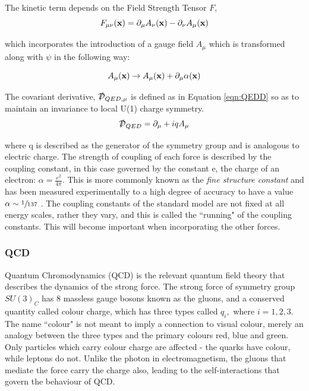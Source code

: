 The kinetic term depends on the Field Strength Tensor $F$, 
\begin{equation}
F_{\mu \nu} (\mathbf{x}) = \partial_{\mu} A_{\nu}(\mathbf{x}) -   \partial_{\nu} A_{\mu}(\mathbf{x}) 
\end{equation}

which incorporates the introduction of a gauge field $A_{\mu}$ which is transformed along with $\psi$ in the following way:

\begin{equation}
A_{\mu}(\mathbf{x}) \rightarrow A_{\mu}(\mathbf{x}) + \partial_{\mu} \alpha(\mathbf{x})
\label{AQED}
\end{equation}

The  covariant derivative, $\slashed{\mathcal{D}}_{QED,\mu}$ is defined as in Equation \ref{eqn:QEDD} so as to maintain an invariance to local U(1) charge symmetry. 
\begin{equation}
\slashed{\mathcal{D}}_{QED} = \partial_{\mu} + iqA_{\mu}
\label{eqn:QEDD}
\end{equation}


where q is described as the generator of the symmetry group and is analogous to electric charge. The strength of coupling of each force is described by the coupling constant, in this case governed by the constant e, the charge of an electron: $\alpha = \frac{e^{2}}{4\pi}$. This is more commonly known as the \textit{fine structure constant} and has been measured experimentally to a high degree of accuracy to have a value $\alpha \sim \sfrac{1}{137}$ \cite{qedalpha}. The coupling constants of the standard model are not fixed at all energy scales, rather they vary, and this is called the ``running" of the coupling constants. This will become important when incorporating the other forces. 

\subsubsection{QCD}

Quantum Chromodynamics (QCD) is the relevant quantum field theory that describes the dynamics of the strong force. The strong force of symmetry group $SU(3)_{C}$ has 8 massless gauge bosons known as the gluons, and a conserved quantity called colour charge, which has three types called $q_{i},$ where $i=1, 2, 3$. The name ``colour" is not meant to imply a connection to visual colour, merely an analogy between the three types and the primary colours red, blue and green. Only particles which carry colour charge are affected - the quarks have colour, while leptons do not. Unlike the photon in electromagnetism, the gluons that mediate the force carry the charge also, leading to the self-interactions that govern the behaviour of QCD. 

